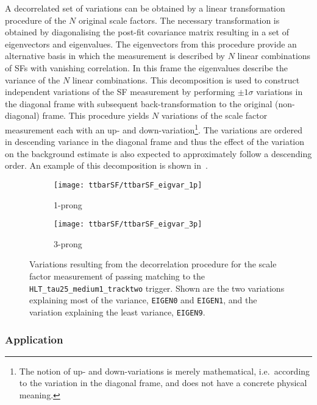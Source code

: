 A decorrelated set of variations can be obtained by a linear
transformation procedure of the $N$ original scale factors. The
necessary transformation is obtained by diagonalising the post-fit
covariance matrix resulting in a set of eigenvectors and
eigenvalues. The eigenvectors from this procedure provide an
alternative basis in which the measurement is described by $N$ linear
combinations of SFs with vanishing correlation. In this frame the
eigenvalues describe the variance of the $N$ linear combinations. This
decomposition is used to construct independent variations of the SF
measurement by performing $\pm 1 \sigma$ variations in the diagonal
frame with subsequent back-transformation to the original
(non-diagonal) frame. This procedure yields $N$ variations of the
scale factor measurement each with an up- and
down-variation\footnote{The notion of up- and down-variations is
  merely mathematical, i.e.\ according to the variation in the
  diagonal frame, and does not have a concrete physical meaning.}. The
variations are ordered in descending variance in the diagonal frame
and thus the effect of the variation on the background estimate is
also expected to approximately follow a descending order. An example
of this decomposition is shown
in~.

\begin{figure}[htbp]
  \centering

  \begin{subfigure}[t]{.495\textwidth}
    \texttt{[image: ttbarSF/ttbarSF\_eigvar\_1p]}
    \caption{1-prong \tauhadvis}
    \label{fig:ttbarSF_eigenvariations_1p}
  \end{subfigure}\hfill%
  \begin{subfigure}[t]{.495\textwidth}
    \texttt{[image: ttbarSF/ttbarSF\_eigvar\_3p]}
    \caption{3-prong \tauhadvis}
    \label{fig:ttbarSF_eigenvariations_3p}
  \end{subfigure}

  \caption{Variations resulting from the decorrelation procedure for
    the scale factor measurement of \tauhadvis passing matching to the
    \texttt{HLT\_tau25\_medium1\_tracktwo} trigger. Shown are the two
    variations explaining most of the variance, \texttt{EIGEN0} and
    \texttt{EIGEN1}, and the variation explaining the least variance,
    \texttt{EIGEN9}.}
  \label{fig:ttbarSF_eigenvariations}
\end{figure}


\subsubsection{Application}

